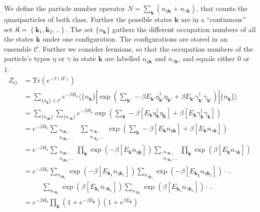 \documentclass[../main.tex]{subfile}
\begin{document}
We define the particle number operator $N = \sum_{\bm{k}}\left( n_{\eta\bm{k}} + n_{\gamma\bm{k}}\right)$, that counts the quasiparticles of both class. 
Further the possible states $\bm{k}$ are in a ``continuous'' set $\mathfrak{K}= \left\{\bm{k}_1,\bm{k}_2,..\right\}$. The set $\{n_{\bm{k}}\}$ gathers
the different occupation numbers of all the states $\bm{k}$ under one configuration. The configurations are stored in an ensemble $\mathcal{C}$. 
Further we consider fermions, so that the occupation numbers of the particle's
types $\eta$ or $\gamma$ in state $\bm{k}$ are labelled $n_{\eta\bm{k}}$ and $n_{\gamma\bm{k}}$,
and equals either 0 or 1.
\begin{align*}
    Z_G &= \text{Tr}\left(e^{-\beta( H)}\right)\\
    &= \sum_{\{n_{\bm{k}}\}\in\mathcal{C}} e^{-\beta H_0} \langle \{n_{\bm{k}}\}|\exp\left(\sum_{\bm{k'}}-\beta E_{\bm{k'}}\eta_{\bm{k'}}^{\dagger}\eta_{\bm{k'}} + \beta E_{\bm{k'}}\gamma_{\bm{k'}}^{\dagger}\gamma_{\bm{k'}}\right)|\{n_{\bm{k}}\}\rangle\\
    &= \sum_{\{n_{\eta\bm{k}}\}} \sum_{\{n_{\gamma\bm{k}}\}} e^{-\beta H_0}\exp\left(\sum_{\bm{k}}-\beta \left[E_{\bm{k}}\eta_{\bm{k}}^{\dagger}\eta_{\bm{k}}\right]+ \beta \left[E_{\bm{k}}\gamma_{\bm{k}}^{\dagger}\gamma_{\bm{k}}\right]\right)\\
    &= e^{-\beta H_0} \sum_{\substack{n_{\eta\bm{k}_1},\\ n_{\eta\bm{k}_2},..}} ~~\sum_{\substack{n_{\gamma\bm{k}_1}, \\n_{\gamma\bm{k}_2},..}}\exp\left(\sum_{\bm{k}}-\beta \left[E_{\bm{k}}n_{\eta\bm{k}}\right]+ \beta \left[E_{\bm{k}}n_{\gamma\bm{k}}\right]\right)\\
    &= e^{-\beta H_0} \sum_{\substack{n_{\eta\bm{k}_1},\\ n_{\eta\bm{k}_2},..}} \prod_{\bm{k}}\exp\left(-\beta\left[ E_{\bm{k}}n_{\eta\bm{k}} \right]\right)  \sum_{\substack{n_{\gamma\bm{k}_1}, \\n_{\gamma\bm{k}_2},..}}\prod_{\bm{k}} \exp\left(\beta\left[E_{\bm{k}}n_{\gamma\bm{k}}\right]\right) \\
    &= e^{-\beta H_0} \sum_{n_{\eta\bm{k}_1}}\exp\left(-\beta\left[E_{\bm{k_1}}n_{\eta\bm{k}_1} \right]\right)\sum_{n_{\eta\bm{k}_2}}\exp\left(-\beta\left[E_{\bm{k_2}}n_{\eta\bm{k}_2} \right]\right)\cdot..  \\
    &~~~~~~~~~~~~\sum_{n_{\gamma\bm{k}_1}} \exp\left(\beta\left[E_{\bm{k}_1}n_{\gamma\bm{k}_1}\right]\right)\sum_{n_{\gamma\bm{k}_2}} \exp\left(\beta\left[E_{\bm{k}_2}n_{\gamma\bm{k}_2}\right]\right)\cdot..\\
    &= e^{-\beta H_0} \prod_{\bm{k}}  \left(1 + e^{-\beta E_{\bm{k}}}\right) \left(1 + e^{\beta E_{\bm{k}}}\right) \\
\end{align*}
\end{document}
